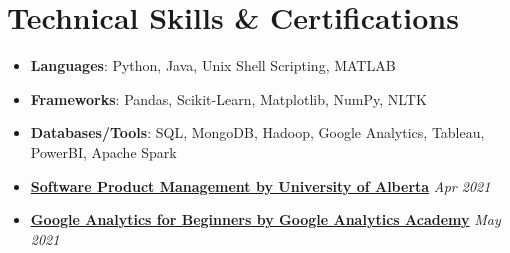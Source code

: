 \documentclass[letterpaper,10pt]{article}
\newcommand{\resumeItem}[2]{
  \item\small{
    \textbf{#1}{: #2 \vspace{-2pt}}
  }
}
\newcommand{\resumeItemNoColon}[2]{
  \item\small{
    \textbf{#1}{ #2 \vspace{-2pt}}
  }
}
\newcommand{\resumeSubItem}[2]{\resumeItem{#1}{#2}\vspace{-2pt}}
\newcommand{\resumeSubItemNoColon}[2]{\resumeItemNoColon{#1}{#2}\vspace{-4pt}}
\newcommand{\resumeSubHeadingListStart}{\begin{itemize}[leftmargin=*]}
\newcommand{\resumeSubHeadingListEnd}{\end{itemize}}
\def\faGears{\unichar{"F085}}
\begin{document}
\section{{\faGears} Technical Skills \& Certifications}
\vspace{4pt}
 \resumeSubHeadingListStart
 \resumeSubItem{Languages}{Python, Java, Unix Shell Scripting, MATLAB}
 \resumeSubItem{Frameworks}{Pandas, Scikit-Learn,  Matplotlib, NumPy, NLTK}
 \resumeSubItem{Databases/Tools}{SQL, MongoDB, Hadoop, Google Analytics, Tableau, PowerBI, Apache Spark}
 \resumeSubItemNoColon{\href{https://coursera.org/share/9834e0256629ce5b4fa655625566ce44}{\underline{Software Product Management} by University of Alberta}}\hfill\emph{Apr 2021}
 \resumeSubItemNoColon{\href{https://analytics.google.com/analytics/academy/certificate/OEBBwV8eQrGW62SQrICQ4Q}{\underline{Google Analytics for Beginners} by Google Analytics Academy}}\hfill\emph{May 2021}
 
 \resumeSubHeadingListEnd
\end{document}
